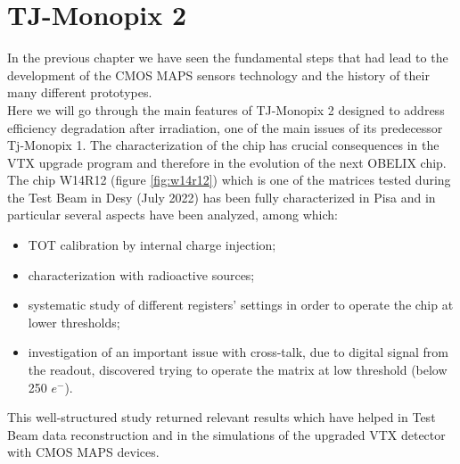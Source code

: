 
\begin{comment}
Normal/Cascode differ only by one transistor designed to increase gain

Voltage step applied trough injection capacitor
\end{comment}


\chapter{TJ-Monopix 2}

In the previous chapter we have seen the fundamental steps that had lead to the development of the CMOS MAPS sensors technology and the history of their many different prototypes. \\
Here we will go through the main features of TJ-Monopix 2 designed to address efficiency degradation after irradiation, one of the main issues of its predecessor Tj-Monopix 1. The characterization of the chip has crucial consequences in the VTX upgrade program and therefore in the evolution of the next OBELIX chip.\\
The chip W14R12 (figure \vref{fig:w14r12}) which is one of the matrices tested during the Test Beam in Desy (July 2022) has been fully characterized in Pisa and in particular several aspects have been analyzed, among which:

\begin{itemize}
\item TOT calibration by internal charge injection;
\item characterization with radioactive sources;
\item systematic study of different registers' settings in order to operate the chip at lower thresholds;
\item investigation of an important issue with cross-talk, due to digital signal from the readout, discovered trying to operate the matrix at low threshold (below 250 $e^{-}$).
\end{itemize}

This well-structured study returned relevant results which have helped in Test Beam data reconstruction and in the simulations of the upgraded VTX detector with CMOS MAPS devices.




